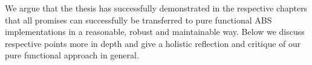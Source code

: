 We argue that the thesis has successfully demonstrated in the respective chapters that all promises can successfully be transferred to pure functional ABS implementations in a reasonable, robust and maintainable way. Below we discuss respective points more in depth and give a holistic reflection and critique of our pure functional approach in general.











